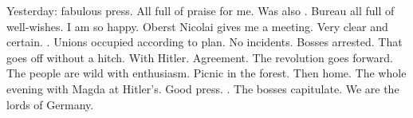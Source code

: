 Yesterday: fabulous press. All full of praise for me.  Was also . Bureau all full of well-wishes. I am so happy. Oberst Nicolai gives me a meeting. Very clear and certain. . Unions occupied according to plan. No incidents. Bosses arrested. That goes off without a hitch. With Hitler. Agreement. The revolution goes forward.  The people are wild with enthusiasm. Picnic in the forest. Then home. The whole evening with Magda at Hitler's. Good press. . The bosses capitulate. We are the lords of Germany.